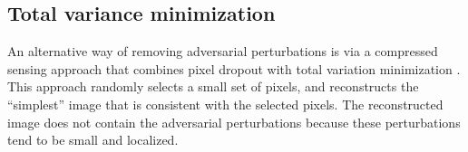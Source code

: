 





\subsection{Total variance minimization}
An alternative way of removing adversarial perturbations is via a compressed sensing approach that combines pixel dropout with total variation minimization \citep{rudin1992tvm}. This approach randomly selects a small set of pixels, and reconstructs the ``simplest'' image that is consistent with the selected pixels. The reconstructed image does not contain the adversarial perturbations because these perturbations tend to be small and localized.

